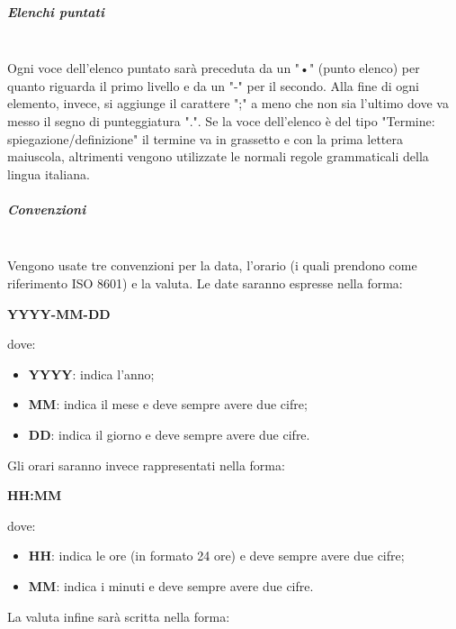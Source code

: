                 \subparagraph{Elenchi puntati}\mbox{}\\ [1mm]
                    Ogni voce dell'elenco puntato sarà preceduta da un "•" (punto elenco) per quanto riguarda il primo livello e da un "-" per il secondo.
                    Alla fine di ogni elemento, invece, si aggiunge il carattere ";" a meno che non sia l'ultimo dove va messo il segno di punteggiatura ".".
                    Se la voce dell'elenco è del tipo "Termine: spiegazione/definizione" il termine va in grassetto e con la prima lettera maiuscola, altrimenti vengono utilizzate le normali regole grammaticali della lingua italiana.
                \subparagraph{Convenzioni}\mbox{}\\ [1mm]
                    Vengono usate tre convenzioni per la data, l'orario (i quali prendono come riferimento ISO 8601) e la valuta. Le date saranno espresse nella forma: \newline \newline
                    \centerline{\textbf{YYYY-MM-DD}} \newline \newline
                    dove:
                    \begin{itemize}
                        \item \textbf{YYYY}: indica l'anno;
                        \item \textbf{MM}: indica il mese e deve sempre avere due cifre;
                        \item \textbf{DD}: indica il giorno e deve sempre avere due cifre.
                    \end{itemize}
                    Gli orari saranno invece rappresentati nella forma: \newline \newline
                    \centerline{\textbf{HH:MM}} \newline \newline
                    dove:
                    \begin{itemize}
                        \item \textbf{HH}: indica le ore (in formato 24 ore) e deve sempre avere due cifre;
                        \item \textbf{MM}: indica i minuti e deve sempre avere due cifre.
                    \end{itemize}
                    La valuta infine sarà scritta nella forma: \newline \newline
